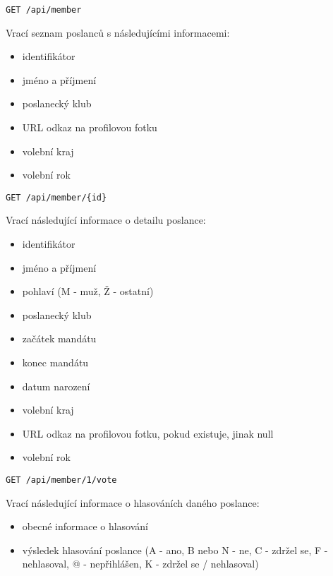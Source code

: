 \vspace{10px}

\begin{lstlisting}
GET /api/member
\end{lstlisting}

\noindent Vrací seznam poslanců s následujícími informacemi:

\begin{itemize}
	\item identifikátor
	\item jméno a příjmení
	\item poslanecký klub
	\item URL odkaz na profilovou fotku
	\item volební kraj
	\item volební rok
\end{itemize}

\vspace{10px}

\begin{lstlisting}
GET /api/member/{id}
\end{lstlisting}

\noindent Vrací následující informace o detailu poslance:

\begin{itemize}
	\item identifikátor
	\item jméno a příjmení
	\item pohlaví (M - muž, Ž - ostatní)
	\item poslanecký klub
	\item začátek mandátu
	\item konec mandátu
	\item datum narození
	\item volební kraj
	\item URL odkaz na profilovou fotku, pokud existuje, jinak null
	\item volební rok
\end{itemize}

\vspace{10px}

\begin{lstlisting}
GET /api/member/1/vote
\end{lstlisting}

\noindent Vrací následující informace o hlasováních daného poslance:

\begin{itemize}
\item obecné informace o hlasování
\item výsledek hlasování poslance (A - ano, B nebo N - ne, C - zdržel se, F - nehlasoval, @ - nepřihlášen, K - zdržel se / nehlasoval)
\end{itemize}

